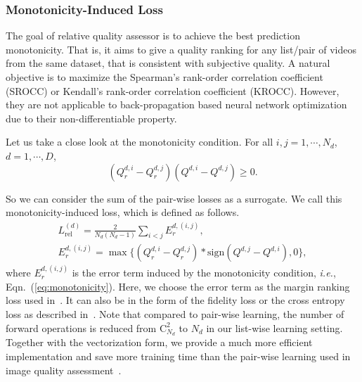 \documentclass[twocolumn]{svjour3}          \smartqed  \usepackage{graphicx}
\begin{document}
\subsubsection{Monotonicity-Induced Loss}
The goal of relative quality assessor is to achieve the best prediction monotonicity. 
That is, it aims to give a quality ranking for any list/pair of videos from the same dataset, that is consistent with subjective quality. 
A natural objective is to maximize the Spearman's rank-order correlation coefficient (SROCC) or Kendall's rank-order correlation coefficient (KROCC). 
However, they are not applicable to back-propagation based neural network optimization due to their non-differentiable property. 

Let us take a close look at the monotonicity condition. 
For all  $i, j = 1, \cdots, N_d$, $d=1, \cdots, D$, 
\begin{equation}\label{eq:monotonicity}
(Q^{d, i}_r-Q^{d, j}_r)(Q^{d, i}-Q^{d, j})\ge 0.
\end{equation}

So we can consider the sum of the pair-wise losses as a surrogate.  We call this monotonicity-induced loss, which is defined as follows.
\begin{equation}\label{eq:mloss}
\begin{array}{l}
L^{(d)}_{\mathrm{rel}} =\frac{2}{N_d(N_d-1)}\sum_{i<j} E^{d,(i,j)}_r,\\[2mm]
E^{d,(i,j)}_r=\max\{(Q^{d, i}_r-Q^{d, j}_r)*\mathrm{sign}(Q^{d, j}-Q^{d, i}), 0\},
\end{array}
\end{equation}
where $E^{d,(i,j)}_r$ is the error term induced by the monotonicity condition, \textit{i.e.}, Eqn.~(\ref{eq:monotonicity}). 
Here, we choose the error term as the margin ranking loss used in~\citet{yang2019cnn}. 
It can also be in the form of the fidelity loss or the cross entropy loss as described in~\citet{zhang2019learning}. 
Note that compared to pair-wise learning, the number of forward operations is reduced from $\mathrm{C}_{N_d}^2$ to $N_d$ in our list-wise learning setting. 
Together with the vectorization form, we provide a much more efficient implementation and save more training time than the pair-wise learning used in image quality assessment~\citep{yang2019cnn,zhang2019learning}.
\end{document}
